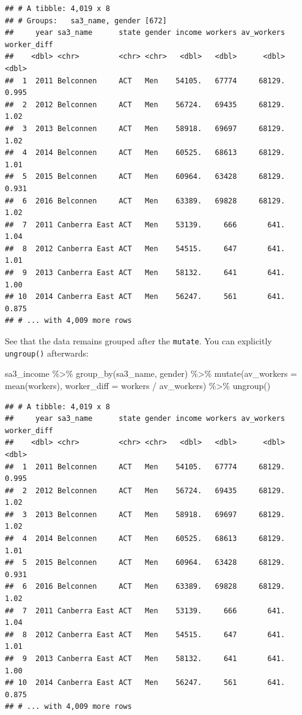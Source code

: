 \documentclass[
]{book}
\newenvironment{Shaded}{\begin{snugshade}}{\end{snugshade}}
\newcommand{\AttributeTok}[1]{\textcolor[rgb]{0.77,0.63,0.00}{#1}}
\newcommand{\FunctionTok}[1]{\textcolor[rgb]{0.00,0.00,0.00}{#1}}
\newcommand{\NormalTok}[1]{#1}
\newcommand{\SpecialCharTok}[1]{\textcolor[rgb]{0.00,0.00,0.00}{#1}}
\begin{document}
\begin{verbatim}
## # A tibble: 4,019 x 8
## # Groups:   sa3_name, gender [672]
##     year sa3_name      state gender income workers av_workers worker_diff
##    <dbl> <chr>         <chr> <chr>   <dbl>   <dbl>      <dbl>       <dbl>
##  1  2011 Belconnen     ACT   Men    54105.   67774     68129.       0.995
##  2  2012 Belconnen     ACT   Men    56724.   69435     68129.       1.02 
##  3  2013 Belconnen     ACT   Men    58918.   69697     68129.       1.02 
##  4  2014 Belconnen     ACT   Men    60525.   68613     68129.       1.01 
##  5  2015 Belconnen     ACT   Men    60964.   63428     68129.       0.931
##  6  2016 Belconnen     ACT   Men    63389.   69828     68129.       1.02 
##  7  2011 Canberra East ACT   Men    53139.     666       641.       1.04 
##  8  2012 Canberra East ACT   Men    54515.     647       641.       1.01 
##  9  2013 Canberra East ACT   Men    58132.     641       641.       1.00 
## 10  2014 Canberra East ACT   Men    56247.     561       641.       0.875
## # ... with 4,009 more rows
\end{verbatim}

See that the data remains grouped after the \texttt{mutate}. You can explicitly \texttt{ungroup()} afterwards:

\begin{Shaded}
\begin{Highlighting}[]
\NormalTok{sa3\_income }\SpecialCharTok{\%\textgreater{}\%} 
  \FunctionTok{group\_by}\NormalTok{(sa3\_name, gender) }\SpecialCharTok{\%\textgreater{}\%} 
  \FunctionTok{mutate}\NormalTok{(}\AttributeTok{av\_workers =} \FunctionTok{mean}\NormalTok{(workers),}
         \AttributeTok{worker\_diff =}\NormalTok{ workers }\SpecialCharTok{/}\NormalTok{ av\_workers) }\SpecialCharTok{\%\textgreater{}\%} 
  \FunctionTok{ungroup}\NormalTok{()}
\end{Highlighting}
\end{Shaded}

\begin{verbatim}
## # A tibble: 4,019 x 8
##     year sa3_name      state gender income workers av_workers worker_diff
##    <dbl> <chr>         <chr> <chr>   <dbl>   <dbl>      <dbl>       <dbl>
##  1  2011 Belconnen     ACT   Men    54105.   67774     68129.       0.995
##  2  2012 Belconnen     ACT   Men    56724.   69435     68129.       1.02 
##  3  2013 Belconnen     ACT   Men    58918.   69697     68129.       1.02 
##  4  2014 Belconnen     ACT   Men    60525.   68613     68129.       1.01 
##  5  2015 Belconnen     ACT   Men    60964.   63428     68129.       0.931
##  6  2016 Belconnen     ACT   Men    63389.   69828     68129.       1.02 
##  7  2011 Canberra East ACT   Men    53139.     666       641.       1.04 
##  8  2012 Canberra East ACT   Men    54515.     647       641.       1.01 
##  9  2013 Canberra East ACT   Men    58132.     641       641.       1.00 
## 10  2014 Canberra East ACT   Men    56247.     561       641.       0.875
## # ... with 4,009 more rows
\end{verbatim}
\end{document}
